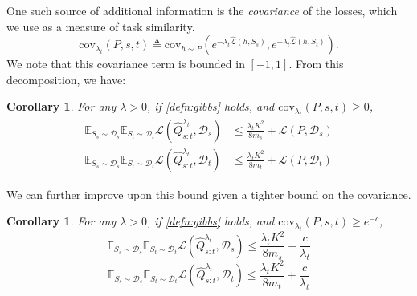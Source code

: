 \documentclass{article}
\theoremstyle{plain}
\newtheorem{corollary}[theorem]{Corollary}
\theoremstyle{definition}
\theoremstyle{remark}
\begin{document}
One such source of additional information is the \emph{covariance} of the losses, which we use as a measure of task similarity. 
%
$$
\mathrm{cov}_{\lambda_t}(P,s,t)\triangleq \mathrm{cov}_{h\sim P}\left (e^{-\lambda_t\hat{\mathcal{L}}(h,S_s)}, e^{-\lambda_t\hat{\mathcal{L}}(h,S_t)}\right ).
$$
%
%
We note that this covariance term is bounded in $[-1, 1]$. From this decomposition, we have:
%
\begin{corollary} \label{thm:cov-2task}
For any $\lambda>0$, if \eqref{defn:gibbs} holds, and $\mathrm{cov}_{\lambda_t}(P,s,t)\geq 0$,      
\begin{align} 
\mathbb{E}_{S_s\sim \mathcal{D}_s}\mathbb{E}_{S_t\sim \mathcal{D}_t}\mathcal{L}( \hat{Q}^{\lambda_t}_{s:t},\mathcal{D}_s)&\leq \frac{\lambda_t K^2}{8m_s}+\mathcal{L}(P,\mathcal{D}_s)\\
%
\mathbb{E}_{S_s\sim \mathcal{D}_s}\mathbb{E}_{S_t\sim \mathcal{D}_t}\mathcal{L}( \hat{Q}^{\lambda_t}_{s:t},\mathcal{D}_t)&\leq \frac{\lambda_t K^2}{8m_t}+\mathcal{L}(P,\mathcal{D}_t) 
\end{align}
\end{corollary}

We can further improve upon this bound given a tighter bound on the covariance.
%
\begin{corollary}
\label{thm:cov-2task-highcov}
For any $\lambda>0$, if \eqref{defn:gibbs} holds, and $\mathrm{cov}_{\lambda_t}(P,s,t)\geq e^{-c}$,    
%
\begin{equation} 
\mathbb{E}_{S_s\sim \mathcal{D}_s}\mathbb{E}_{S_t\sim \mathcal{D}_t}\mathcal{L}( \hat{Q}^{\lambda_t}_{s:t},\mathcal{D}_s)\leq \frac{\lambda_t K^2}{8m_s}+\frac{c}{\lambda_t}
\end{equation}
%
\begin{equation} 
\mathbb{E}_{S_s\sim \mathcal{D}_s}\mathbb{E}_{S_t\sim \mathcal{D}_t}\mathcal{L}( \hat{Q}^{\lambda_t}_{s:t},\mathcal{D}_t)\leq \frac{\lambda_t K^2}{8m_t}+\frac{c}{\lambda_t} 
\end{equation}
\end{corollary}
\end{document}
